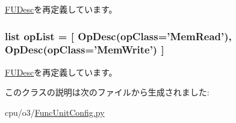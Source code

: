 \hyperlink{classFuncUnit_1_1FUDesc_adf167b42e49fa9d4114bff901e1b1c29}{FUDesc}を再定義しています。\hypertarget{classFuncUnitConfig_1_1RdWrPort_a31b2f9e3ac9a504397b140f513c469cc}{
\subsubsection[{opList}]{\setlength{\rightskip}{0pt plus 5cm}list {\bf opList} = \mbox{[} {\bf OpDesc}(opClass='MemRead'), {\bf OpDesc}(opClass='MemWrite') \mbox{]}}}
\label{classFuncUnitConfig_1_1RdWrPort_a31b2f9e3ac9a504397b140f513c469cc}


\hyperlink{classFuncUnit_1_1FUDesc_aa7a0c51c9e0149c27f9e38f86005dfbe}{FUDesc}を再定義しています。

このクラスの説明は次のファイルから生成されました:\begin{DoxyCompactItemize}
\item 
cpu/o3/\hyperlink{FuncUnitConfig_8py}{FuncUnitConfig.py}\end{DoxyCompactItemize}

